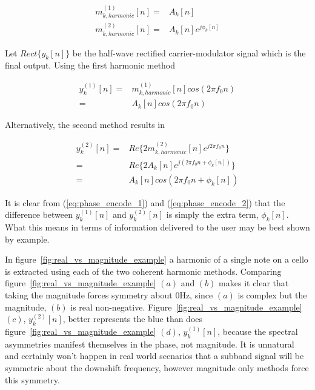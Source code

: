 \documentclass [11pt, proquest,oneside] {ganter_thesis}[2015/03/03]
\begin{document}
\begin{align}
\label{eq:realVSmag1}
m^{(1)}_{k,harmonic}[n] =& A_k[n] \\
m^{(2)}_{k,harmonic}[n] =& A_k[n]e^{j\phi_k[n]}
\end{align}

Let $Rect\{y_k[n]\}$ be the half-wave rectified carrier-modulator signal which is the final output.  Using the first harmonic method

\begin{align}
y_k^{(1)}[n] =& m^{(1)}_{k,harmonic}[n] cos(2\pi f_0 n) \nonumber \\
\label{eq:phase_encode_1}
=& A_k[n] cos(2\pi f_0 n)
\end{align}

Alternatively, the second method results in

\begin{align}
y_k^{(2)}[n] =& Re\{ 2m^{(2)}_{k,harmonic}[n] e^{j2\pi f_0 n} \} \nonumber  \\
=& Re\{ 2A_k[n]e^{j(2\pi f_0 n + \phi_k[n])} \} \nonumber \\
\label{eq:phase_encode_2}
=& A_k[n]cos(2\pi f_0 n + \phi_k[n])
\end{align}

It is clear from (\ref{eq:phase_encode_1}) and (\ref{eq:phase_encode_2}) that the difference between $y_k^{(1)}[n]$ and $y_k^{(2)}[n]$ is simply the extra term, $\phi_k[n]$.  What this means in terms of information delivered to the user may be best shown by example.

In figure~\ref{fig:real_vs_magnitude_example} a harmonic of a single note on a cello is extracted using each of the two coherent harmonic methods.  Comparing figure~\ref{fig:real_vs_magnitude_example} $(a)$ and $(b)$ makes it clear that taking the magnitude forces symmetry about $0$Hz, since $(a)$ is complex but the magnitude, $(b)$ is real non-negative.  Figure~\ref{fig:real_vs_magnitude_example} $(c)$, $y_k^{(2)}[n]$, better represents the blue than does figure~\ref{fig:real_vs_magnitude_example} $(d)$, $y_k^{(1)}[n]$, because the spectral asymmetries manifest themselves in the phase, not magnitude.  It is unnatural and certainly won't happen in real world scenarios that a subband signal will be symmetric about the downshift frequency, however magnitude only methods force this symmetry.
\end{document}
